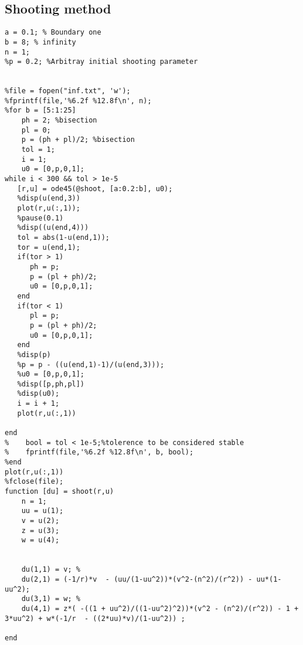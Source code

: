 \documentclass{article}
\begin{document}
\subsection{Shooting method}
\begin{lstlisting}
a = 0.1; % Boundary one
b = 8; % infinity
n = 1;
%p = 0.2; %Arbitray initial shooting parameter


%file = fopen("inf.txt", 'w');
%fprintf(file,'%6.2f %12.8f\n', n);
%for b = [5:1:25]
    ph = 2; %bisection
    pl = 0;
    p = (ph + pl)/2; %bisection
    tol = 1;
    i = 1;
    u0 = [0,p,0,1];
while i < 300 && tol > 1e-5
   [r,u] = ode45(@shoot, [a:0.2:b], u0);
   %disp(u(end,3))
   plot(r,u(:,1));
   %pause(0.1)
   %disp((u(end,4)))
   tol = abs(1-u(end,1));
   tor = u(end,1);
   if(tor > 1)
      ph = p;
      p = (pl + ph)/2;
      u0 = [0,p,0,1];   
   end
   if(tor < 1)
      pl = p;
      p = (pl + ph)/2;
      u0 = [0,p,0,1];  
   end
   %disp(p)
   %p = p - ((u(end,1)-1)/(u(end,3)));
   %u0 = [0,p,0,1];
   %disp([p,ph,pl])
   %disp(u0);
   i = i + 1;
   plot(r,u(:,1))
   
end
%    bool = tol < 1e-5;%tolerence to be considered stable
%    fprintf(file,'%6.2f %12.8f\n', b, bool);
%end
plot(r,u(:,1))
%fclose(file);
function [du] = shoot(r,u)
    n = 1;
    uu = u(1);
    v = u(2);
    z = u(3);
    w = u(4);
    
    
    du(1,1) = v; %
    du(2,1) = (-1/r)*v  - (uu/(1-uu^2))*(v^2-(n^2)/(r^2)) - uu*(1-uu^2);
    du(3,1) = w; % 
    du(4,1) = z*( -((1 + uu^2)/((1-uu^2)^2))*(v^2 - (n^2)/(r^2)) - 1 + 3*uu^2) + w*(-1/r  - ((2*uu)*v)/(1-uu^2)) ;
    
end
\end{lstlisting}
\pagebreak
\end{document}
